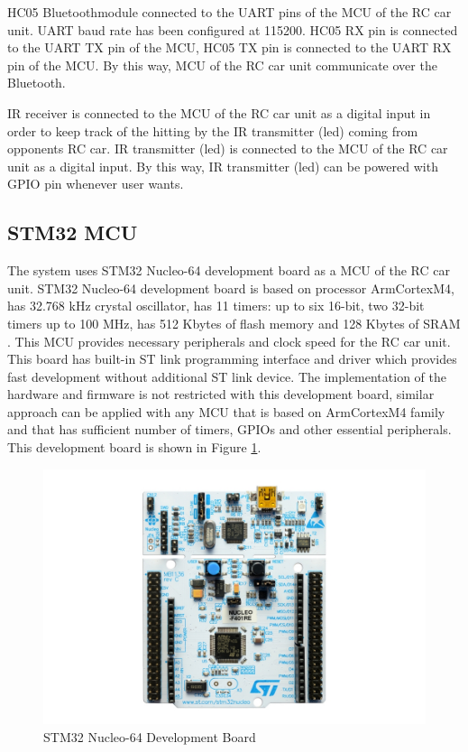 HC05 Bluetooth\texttrademark\;module connected to the UART pins of the MCU of the RC car unit. UART baud rate has been configured at 115200. HC05 RX pin is connected to the UART TX pin of the MCU, HC05 TX pin is connected to the UART RX pin of the MCU. By this way, MCU of the RC car unit communicate over the Bluetooth\texttrademark.

IR receiver is connected to the MCU of the RC car unit as a digital input in order to keep track of the hitting by the IR transmitter (led) coming from opponents RC car. IR transmitter (led) is connected to the MCU of the RC car unit as a digital input. By this way, IR transmitter (led) can be powered with GPIO pin whenever user wants.


\subsection{STM32 MCU}
The system uses STM32 Nucleo-64 development board as a MCU of the RC car unit. STM32 Nucleo-64 development board is based on processor Arm\textregistered\;Cortex\textregistered\;M4, has 32.768 kHz crystal oscillator,  has 11 timers: up to six 16-bit, two 32-bit timers up to 100 MHz, has 512 Kbytes of flash memory and 128 Kbytes of SRAM \cite{One}. This MCU provides necessary peripherals and clock speed for the RC car unit. This board has built-in ST link programming interface and driver which provides fast development without additional ST link device. The implementation of the hardware and firmware is not restricted with this development board, similar approach can be applied with any MCU that is based on Arm\textregistered\;Cortex\textregistered\;M4 family and that has sufficient number of timers, GPIOs and other essential peripherals. This development board is shown in Figure \ref{fig:nucleo64_board}.

\begin{figure}[!htbp]
    \centering
    \includegraphics[width=1\textwidth]{Imgs/nucleo64.jpg}
    \caption{\label{fig:nucleo64_board}STM32 Nucleo-64 Development Board \cite{One}}
\end{figure}

